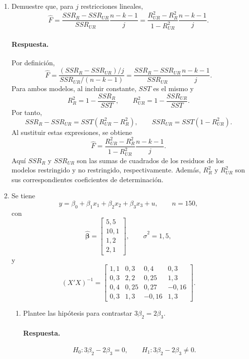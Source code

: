 \documentclass[letterpaper,11pt]{article}
\newcommand{\respuesta}{\color{blue}\paragraph{Respuesta.}}
\begin{document}
\begin{enumerate}[resume]
\begin{enumerate}[label=(\alph*)]
    \item\color{black} Los valores críticos son $F_{0{,}05}^{(2,348)}\approx3{,}02$ y
    $F_{0{,}05}^{(4,348)}\approx2{,}40$.

    \respuesta Las decisiones son las indicadas en (a) y (b): se rechazan
    ambas hipótesis nulas.
\end{enumerate}

\item\color{black} Demuestre que, para $j$ restricciones lineales,
\[
    \widehat F
    =\frac{SSR_R-SSR_{UR}}{SSR_{UR}}\frac{n-k-1}{j}
    =\frac{R^2_{UR}-R^2_R}{1-R^2_{UR}}\frac{n-k-1}{j}.
\]

\respuesta Por definición,
\[
    \widehat F=\frac{(SSR_R-SSR_{UR})/j}{SSR_{UR}/(n-k-1)}
    =\frac{SSR_R-SSR_{UR}}{SSR_{UR}}\frac{n-k-1}{j}.
\]
Para ambos modelos, al incluir constante, $SST$ es el mismo y
\[
    R^2_R=1-\frac{SSR_R}{SST},
    \qquad
    R^2_{UR}=1-\frac{SSR_{UR}}{SST}.
\]
Por tanto,
\[
    SSR_R-SSR_{UR}=SST(R^2_{UR}-R^2_R),
    \qquad
    SSR_{UR}=SST(1-R^2_{UR}).
\]
Al sustituir estas expresiones, se obtiene
\[
    \widehat F=
    \frac{R^2_{UR}-R^2_R}{1-R^2_{UR}}\frac{n-k-1}{j}.
\]
Aquí $SSR_R$ y $SSR_{UR}$ son las sumas de cuadrados de los residuos de los
modelos restringido y no restringido, respectivamente. Además,
$R_R^2$ y $R_{UR}^2$ son sus correspondientes coeficientes de determinación.

\item\color{black} Se tiene
\[
    y=\beta_0+\beta_1x_1+\beta_2x_2+\beta_3x_3+u,
    \qquad n=150,
\]
con
\[
    \widehat{\boldsymbol\beta}=\begin{bmatrix}5{,}5\\10{,}1\\1{,}2\\2{,}1\end{bmatrix},
    \qquad \widehat{\sigma}^{2}=1{,}5,
\]
y
\[
    (X'X)^{-1}=\begin{bmatrix}
        1{,}1&0{,}3&0{,}4&0{,}3\\
        0{,}3&2{,}2&0{,}25&1{,}3\\
        0{,}4&0{,}25&0{,}27&-0{,}16\\
        0{,}3&1{,}3&-0{,}16&1{,}3
    \end{bmatrix}.
\]
\begin{enumerate}[label=(\alph*)]
    \item\color{black} Plantee las hipótesis para contrastar $3\beta_2=2\beta_3$.

    \respuesta
    \[
        H_0:3\beta_2-2\beta_3=0,
        \qquad H_1:3\beta_2-2\beta_3\neq0.
    \]


\end{enumerate}
\end{enumerate}
\end{document}
